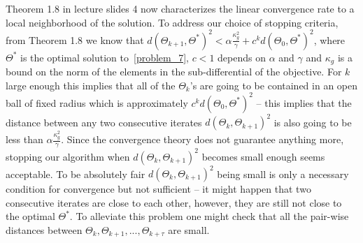 \documentclass{article}
\newcommand{\0}{\mathrm{0}}
\newcommand{\1}{\mathrm{1}}
\begin{document}
Theorem 1.8 in lecture slides 4 now characterizes the linear convergence rate to a local neighborhood of the solution. To address our choice of stopping criteria, from Theorem 1.8 we know that  $d(\Theta_{k+1},\Theta^*)^2 < \alpha\frac{\kappa_g^2}{\gamma} + c^kd(\Theta_0,\Theta^*)^2$, where $\Theta^*$ is the optimal solution to~\ref{problem_7}, $c<1$ depends on $\alpha$ and $\gamma$ and $\kappa_g$ is a bound on the norm of the elements in the sub-differential of the objective. For $k$ large enough this implies that all of the $\Theta_{k}$'s are going to be contained in an open ball of fixed radius which is approximately $c^kd(\Theta_0,\Theta^*)^2$ -- this implies that the distance between any two consecutive iterates $d(\Theta_k,\Theta_{k+1})^2$ is also going to be less than $\alpha\frac{\kappa_g^2}{\gamma}$. Since the convergence theory does not guarantee anything more, stopping our algorithm when $d(\Theta_k,\Theta_{k+1})^2$ becomes small enough seems acceptable. To be absolutely fair $d(\Theta_k,\Theta_{k+1})^2$ being small is only a necessary condition for convergence but not sufficient -- it might happen that two consecutive iterates are close to each other, however, they are still not close to the optimal $\Theta^*$. To alleviate this problem one might check that all the pair-wise distances between $\Theta_k,\Theta_{k+1},...,\Theta_{k+\tau}$ are small.
\end{document}
